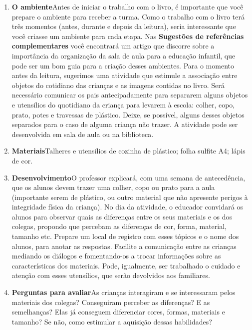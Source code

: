 \documentclass[11pt]{extarticle}
\begin{document}
\begin{enumerate}
\item \textbf{O ambiente}\quad Antes de iniciar o trabalho com o livro, é importante que você 
prepare o ambiente para receber a turma. Como o trabalho com o livro terá 
três momentos (antes, durante e depois da leitura), seria interessante que você 
criasse um ambiente para cada etapa. Nas \textbf{Sugestões de referências complementares} 
você encontrará um artigo que discorre sobre a importância da organização da sala 
de aula para a educação infantil, que pode ser um bom guia para a criação desses 
ambientes.
Para o momento antes da leitura, sugerimos uma atividade que estimule a
associação entre  objetos do cotidiano das crianças e as imagens contidas no livro. Será necessário comunicar os pais antecipadamente para separarem alguns objetos e utensílios do quotidiano da criança para levarem à escola: colher, copo, prato, potes e travessas de plástico. Deixe, se possível, alguns desses objetos separados para o caso de alguma criança não trazer. A atividade pode ser desenvolvida em sala de aula ou na biblioteca.



\item \textbf{Materiais}\quad Talheres e utensílios de cozinha de plástico; folha sulfite A4; lápis de cor.

\item \textbf{Desenvolvimento}\quad O professor explicará, com uma semana de antecedência, que os alunos devem trazer uma colher, copo ou prato para a aula (importante serem de plástico, ou outro material que não apresente perigos à integridade física da criança). No dia da atividade, o educador convidará os alunos para observar quais as diferenças entre os seus materiais e os dos colegas, propondo que percebam as diferenças de cor, forma, material,  tamanho etc. Prepare um local de registro com esses tópicos e o nome dos alunos, para anotar as respostas. Facilite a comunicação entre as crianças mediando os diálogos e fomentando-os a trocar informações sobre as características dos materiais. Pode, igualmente, ser trabalhado o cuidado e atenção com esses utensílios, que serão devolvidos aos familiares.

\item \textbf{Perguntas para avaliar}\quad As crianças interagiram e se interessaram pelos materiais dos colegas? Conseguiram perceber as diferenças? E as semelhanças? Elas já conseguem diferenciar cores, formas, materiais e tamanho? Se não, como estimular a aquisição dessas habilidades? 

\end{enumerate}
\end{document}
